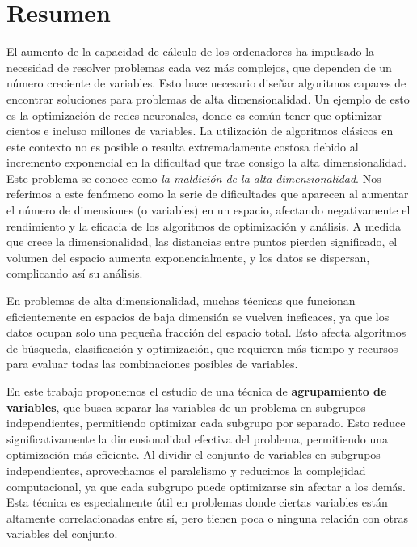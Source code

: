 %

\chapter{Resumen}

\indent El aumento de la capacidad de cálculo de los ordenadores ha impulsado la necesidad de resolver problemas cada vez más complejos, que dependen de un número creciente de variables. Esto hace necesario diseñar algoritmos capaces de encontrar soluciones para problemas de alta dimensionalidad. Un ejemplo de esto es la optimización de redes neuronales, donde es común tener que optimizar cientos e incluso millones de variables. La utilización de algoritmos clásicos en este contexto no es posible o resulta extremadamente costosa debido al incremento exponencial en la dificultad que trae consigo la alta dimensionalidad. Este problema se conoce como \textit{la maldición de la alta dimensionalidad}. Nos referimos a este fenómeno como la serie de dificultades que aparecen al aumentar el número de dimensiones (o variables) en un espacio, afectando negativamente el rendimiento y la eficacia de los algoritmos de optimización y análisis. A medida que crece la dimensionalidad, las distancias entre puntos pierden significado, el volumen del espacio aumenta exponencialmente, y los datos se dispersan, complicando así su análisis.

En problemas de alta dimensionalidad, muchas técnicas que funcionan eficientemente en espacios de baja dimensión se vuelven ineficaces, ya que los datos ocupan solo una pequeña fracción del espacio total. Esto afecta algoritmos de búsqueda, clasificación y optimización, que requieren más tiempo y recursos para evaluar todas las combinaciones posibles de variables.

En este trabajo proponemos el estudio de una técnica de \textbf{agrupamiento de variables}, que busca separar las variables de un problema en subgrupos independientes, permitiendo optimizar cada subgrupo por separado. Esto reduce significativamente la dimensionalidad efectiva del problema, permitiendo una optimización más eficiente. Al dividir el conjunto de variables en subgrupos independientes, aprovechamos el paralelismo y reducimos la complejidad computacional, ya que cada subgrupo puede optimizarse sin afectar a los demás. Esta técnica es especialmente útil en problemas donde ciertas variables están altamente correlacionadas entre sí, pero tienen poca o ninguna relación con otras variables del conjunto.

